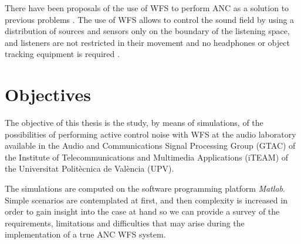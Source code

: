 There have been proposals of the use of WFS to perform ANC as a solution to previous problems \cite{Lapini2016,Kuntz2004,Zanolin1999,Morcillo2015}. The use of WFS allows to control the sound field by using a distribution of sources and sensors only on the boundary of the listening space, and listeners are not restricted in their movement and no headphones or object tracking equipment is required \cite{Kuntz2004}.

\section{Objectives}

The objective of this thesis is the study, by means of simulations, of the possibilities of performing active control noise with WFS at the audio laboratory available in the Audio and Communications Signal Processing Group (GTAC) of the Institute of Telecommunications and Multimedia Applications (iTEAM) of the Universitat Politècnica de València (UPV).

The simulations are computed on the software programming platform \emph{Matlab}. Simple scenarios are contemplated at first, and then complexity is increased in order to gain insight into the case at hand so we can provide a survey of the requirements, limitations and difficulties that may arise during the implementation of a true ANC WFS system.
